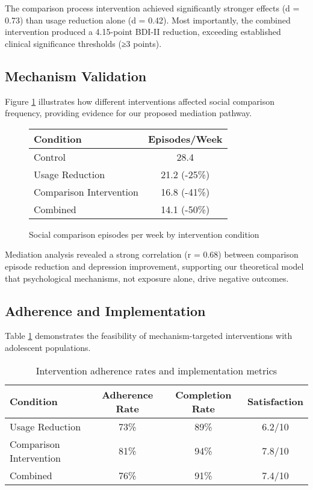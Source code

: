 \documentclass{article}
\begin{document}
The comparison process intervention achieved significantly stronger effects (d = 0.73) than usage reduction alone (d = 0.42). Most importantly, the combined intervention produced a 4.15-point BDI-II reduction, exceeding established clinical significance thresholds (≥3 points).

\subsection{Mechanism Validation}

Figure \ref{fig:comparison-episodes} illustrates how different interventions affected social comparison frequency, providing evidence for our proposed mediation pathway.

\begin{figure}[t]
\centering
\begin{tabular}{|l|c|}
\hline
\textbf{Condition} & \textbf{Episodes/Week} \\
\hline
Control & 28.4 \\
Usage Reduction & 21.2 (-25\%) \\
Comparison Intervention & 16.8 (-41\%) \\
Combined & 14.1 (-50\%) \\
\hline
\end{tabular}
\caption{Social comparison episodes per week by intervention condition}
\label{fig:comparison-episodes}
\end{figure}

Mediation analysis revealed a strong correlation (r = 0.68) between comparison episode reduction and depression improvement, supporting our theoretical model that psychological mechanisms, not exposure alone, drive negative outcomes.

\subsection{Adherence and Implementation}

Table \ref{tab:adherence} demonstrates the feasibility of mechanism-targeted interventions with adolescent populations.

\begin{table}[t]
\caption{Intervention adherence rates and implementation metrics}
\label{tab:adherence}
\centering
\begin{tabular}{lccc}
\toprule
Condition & Adherence Rate & Completion Rate & Satisfaction \\
\midrule
Usage Reduction & 73\% & 89\% & 6.2/10 \\
Comparison Intervention & 81\% & 94\% & 7.8/10 \\
Combined & 76\% & 91\% & 7.4/10 \\
\bottomrule
\end{tabular}
\end{table}
\end{document}
